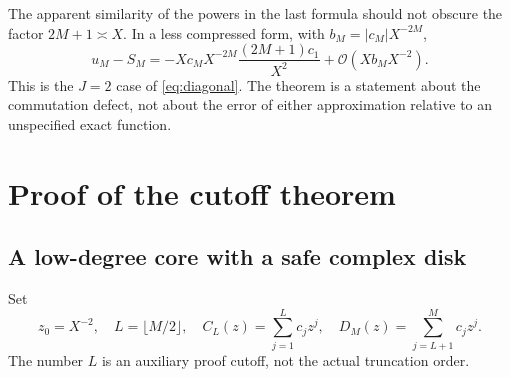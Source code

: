 \documentclass[11pt,a4paper]{article}
\theoremstyle{definition}
\numberwithin{equation}{section}
\newcommand{\Oh}{\mathcal O}
\begin{document}
The apparent similarity of the powers in the last formula should not obscure the factor $2M+1\asymp X$. In a less compressed form, with $b_M=|c_M|X^{-2M}$,
\[
 u_M-S_M=-Xc_MX^{-2M}\frac{(2M+1)c_1}{X^2}
                +\Oh(Xb_MX^{-2}).
\]
This is the $J=2$ case of \eqref{eq:diagonal}. The theorem is a statement about the commutation defect, not about the error of either approximation relative to an unspecified exact function.

\section{Proof of the cutoff theorem}
\label{sec:cutoffproof}

\subsection{A low-degree core with a safe complex disk}
Set
\begin{equation}
 z_0=X^{-2},\quad L=\lfloor M/2\rfloor,\quad
 C_L(z)=\sum_{j=1}^Lc_jz^j,\quad
 D_M(z)=\sum_{j=L+1}^Mc_jz^j.
 \label{eq:split}
\end{equation}
The number $L$ is an auxiliary proof cutoff, not the actual truncation order.
\end{document}
